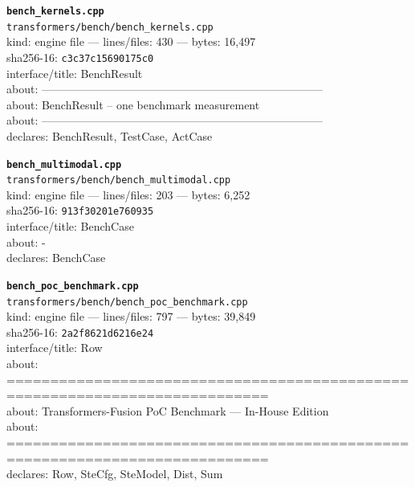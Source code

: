 \noindent\textbf{\texttt{bench\_kernels.cpp}}\\
\texttt{transformers/bench/bench\_kernels.cpp}\\
kind: engine file --- lines/files: 430 --- bytes: 16,497\\
sha256-16: \texttt{c3c37c15690175c0}\\
interface/title: BenchResult\\
about: ---------------------------------------------------------------------------\\
about: BenchResult – one benchmark measurement\\
about: ---------------------------------------------------------------------------\\
declares: BenchResult, TestCase, ActCase\\
\vspace*{6.0pt}

\noindent\textbf{\texttt{bench\_multimodal.cpp}}\\
\texttt{transformers/bench/bench\_multimodal.cpp}\\
kind: engine file --- lines/files: 203 --- bytes: 6,252\\
sha256-16: \texttt{913f30201e760935}\\
interface/title: BenchCase\\
about: -\\
declares: BenchCase\\
\vspace*{6.0pt}
\newpage

\noindent\textbf{\texttt{bench\_poc\_benchmark.cpp}}\\
\texttt{transformers/bench/bench\_poc\_benchmark.cpp}\\
kind: engine file --- lines/files: 797 --- bytes: 39,849\\
sha256-16: \texttt{2a2f8621d6216e24}\\
interface/title: Row\\
about: ============================================================================\\
about: Transformers-Fusion PoC Benchmark — In-House Edition\\
about: ============================================================================\\
declares: Row, SteCfg, SteModel, Dist, Sum\\
\vspace*{6.0pt}

